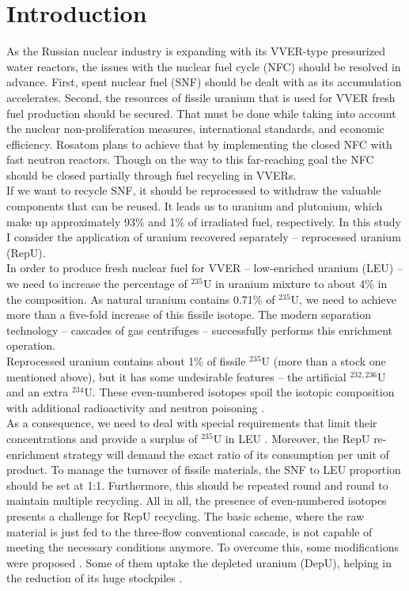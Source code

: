 \documentclass[a4paper]{jpconf}
\begin{document}
\section{Introduction}
As the Russian nuclear industry is expanding with its VVER-type pressurized water reactors, the issues with the nuclear fuel cycle (NFC) should be resolved in advance. First, spent nuclear fuel (SNF) should be dealt with as its accumulation accelerates. Second, the resources of fissile uranium that is used for VVER fresh fuel production should be secured. That must be done while taking into account the nuclear non-proliferation measures, international standards, and economic efficiency. Rosatom plans to achieve that by implementing the closed NFC with fast neutron reactors. Though on the way to this far-reaching goal the NFC should be closed partially through fuel recycling in VVERs.\\
If we want to recycle SNF, it should be reprocessed to withdraw the valuable components that can be reused. It leads us to uranium and plutonium, which make up approximately 93\% and 1\% of irradiated fuel, respectively. In this study I consider the application of uranium recovered separately -- reprocessed uranium (RepU).\\
In order to produce fresh nuclear fuel for VVER -- low-enriched uranium (LEU) -- we need to increase the percentage of $^{235}$U in uranium mixture to about 4\% in the composition. As natural uranium contains 0.71\% of $^{235}$U, we need to achieve more than a five-fold increase of this fissile isotope. The modern separation technology -- cascades of gas centrifuges -- successfully performs this enrichment operation.\\
Reprocessed uranium contains about 1\% of fissile $^{235}$U (more than a stock one mentioned above), but it has some undesirable features -- the artificial $^{232,236}$U and an extra $^{234}$U. These even-numbered isotopes spoil the isotopic composition with additional radioactivity and neutron poisoning \cite{Hida2017, Coleman2010}.\\
As a consequence, we need to deal with special requirements that limit their concentrations and provide a surplus of $^{235}$U in LEU \cite{extra1}. Moreover, the RepU re-enrichment strategy will demand the exact ratio of its consumption per unit of product. To manage the turnover of fissile materials, the SNF to LEU proportion should be set at 1:1. Furthermore, this should be repeated round and round to maintain multiple recycling. All in all, the presence of even-numbered isotopes presents a challenge for RepU recycling. The basic scheme, where the raw material is just fed to the three-flow conventional cascade, is not capable of meeting the necessary conditions anymore. To overcome this, some modifications were proposed \cite{Prusakov2008,Palkin2013,Sulaberidze2006,doi:10.1063/1.5099598,Palkin2015,Palkin2017,Palkin2016}. Some of them uptake the depleted uranium (DepU), helping in the reduction of its huge stockpiles \cite{Smirnov2014}.
\end{document}
